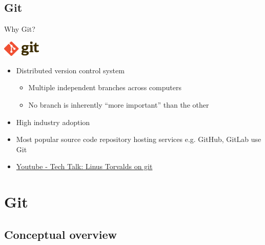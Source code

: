 \documentclass{beamer}
\begin{document}
\subsection{Git}

\begin{frame}{Why Git?}
  \begin{center}
    \includegraphics[height=0.75cm]{assets/gitlogo.png}
  \end{center}
  \begin{itemize}
    \item Distributed version control system
      \begin{itemize}
        \item Multiple independent branches across computers
        \item No branch is inherently “more important” than the other
      \end{itemize}
    \item High industry adoption
    \item Most popular source code repository hosting services e.g. GitHub,
      GitLab use Git
    \item \href{https://www.youtube.com/watch?v=4XpnKHJAok8}{Youtube - Tech
      Talk: Linus Torvalds on git}
  \end{itemize}
\end{frame}

\section{Git}

\subsection{Conceptual overview}
\end{document}
